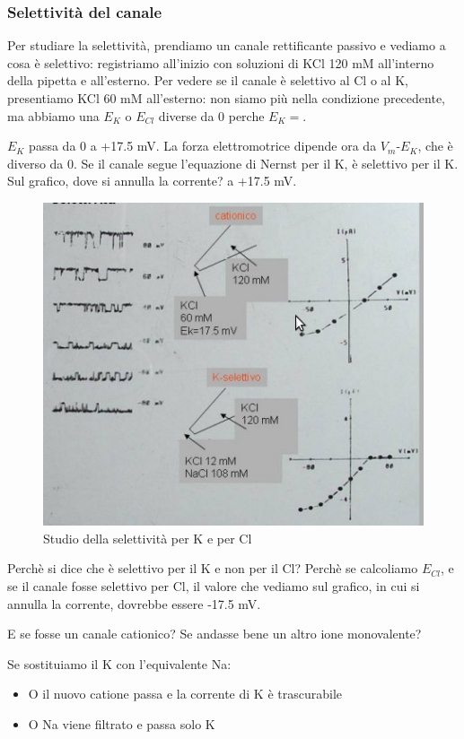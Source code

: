 \documentclass[a4paper,12pt]{article}
\begin{document}
\subsubsection{Selettività del canale}

Per studiare la selettività, prendiamo un canale rettificante passivo e vediamo a cosa è selettivo: registriamo all'inizio con soluzioni di KCl 120 mM all'interno della pipetta e all'esterno. Per vedere se il canale è selettivo al Cl o al K, presentiamo KCl 60 mM all'esterno: non siamo più nella condizione precedente, ma abbiamo una $E_{K}$ o $E_{Cl}$ diverse da 0 perche $E_{K} =$.

$E_{K}$ passa da 0 a +17.5 mV. La forza elettromotrice dipende ora da $V_{m}$-$E_{K}$, che è diverso da 0. Se il canale segue l'equazione di Nernst per il K, è selettivo per il K. Sul grafico, dove si annulla la corrente? a +17.5 mV.
\begin{figure}[H]
\centering
\includegraphics[scale=0.4]{immagine/selettivita.jpg}
\caption{Studio della selettività per K e per Cl}
\end{figure} 

Perchè si dice che è selettivo per il K e non per il Cl? Perchè se calcoliamo $E_{Cl}$, e se il canale fosse selettivo per Cl, il valore che vediamo sul grafico, in cui si annulla la corrente, dovrebbe essere -17.5 mV.

E se fosse un canale cationico? Se andasse bene un altro ione monovalente?

Se sostituiamo il K con l'equivalente Na:
\begin{itemize}
\item{O il nuovo catione passa e la corrente di K è trascurabile}
\item{O Na viene filtrato e passa solo K}
\end{itemize}
\end{document}
